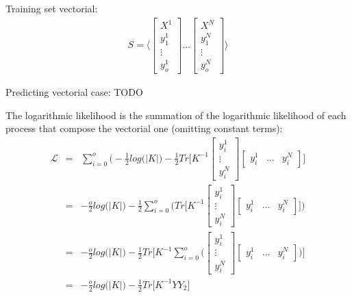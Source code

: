 \documentclass{article}
\begin{document}
Training set vectorial:
\begin{eqnarray}
S = \bigg \langle
\begin{bmatrix} X^1 \\ \hline y^1_1 \\ \vdots \\ y^1_o \end{bmatrix} 
\hdots
\begin{bmatrix} X^N \\ \hline y^N_1 \\ \vdots \\ y^N_o \end{bmatrix} 
\bigg \rangle
\end{eqnarray}

Predicting vectorial case:
TODO

The logarithmic likelihood is the summation of the logarithmic likelihood of each process that compose the vectorial one (omitting constant terms):
\begin{eqnarray}
\mathcal{L} &=& 
\sum_{i=0}^o \bigg (
-\frac{1}{2} log \big (\left | K \right | \big )
-\frac{1}{2} Tr \bigg [
K^{-1} 
\begin{bmatrix} y^1_i \\ \vdots \\ y^N_i \end{bmatrix}
\begin{bmatrix} y^1_i & \hdots & y^N_i \end{bmatrix}
\bigg ]  \\
&=&
-\frac{o}{2} log \big (\left | K \right | \big )
-\frac{1}{2} \sum_{i=0}^o \bigg ( Tr \bigg [
K^{-1} 
\begin{bmatrix} y^1_i \\ \vdots \\ y^N_i \end{bmatrix}
\begin{bmatrix} y^1_i & \hdots & y^N_i \end{bmatrix}
\bigg ] 
\bigg ) \\
&=&
-\frac{o}{2} log \big (\left | K \right | \big )
-\frac{1}{2} Tr \bigg [
K^{-1} \sum_{i=0}^o \bigg (
\begin{bmatrix} y^1_i \\ \vdots \\ y^N_i \end{bmatrix}
\begin{bmatrix} y^1_i & \hdots & y^N_i \end{bmatrix}
\bigg )
\bigg ] \\
&=&
-\frac{o}{2} log \big (\left | K \right | \big )
-\frac{1}{2} Tr \bigg [
K^{-1} YY_2
\bigg ] 
\end{eqnarray}
\end{document}
